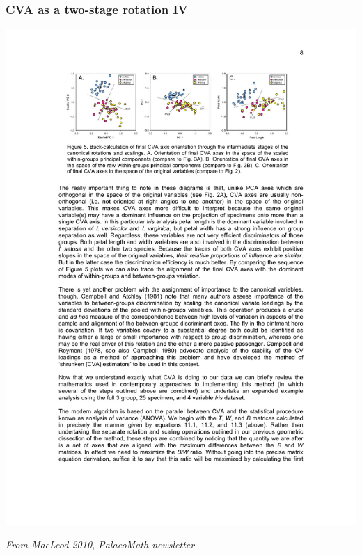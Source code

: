 \documentclass{beamer}
\begin{document}
\begin{frame}
  \frametitle{CVA as a two-stage rotation IV}
  
\begin{center}
\includegraphics[width=\textwidth]{cva-as-rot4}
\end{center}

\hfill {\scriptsize \textit{From MacLeod 2010, PalaeoMath newsletter}}

\end{frame}
\end{document}
